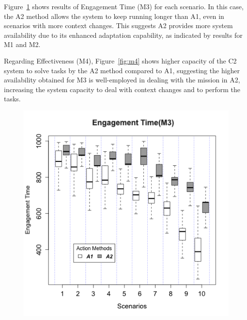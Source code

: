 Figure~\ref{fig:m3} shows results of Engagement Time (M3) for each scenario. In this case, the A2 method allows the system to keep running longer than A1, even in scenarios with more context changes. This suggests A2 provides more system availability due to its enhanced adaptation capability, as indicated by results for M1 and M2. 

 Regarding Effectiveness (M4), Figure~\ref{fig:m4} shows higher  capacity of the C2 system to solve tasks by the A2 method compared to A1, suggesting the higher availability obtained for M3 is well-employed in dealing with the mission in A2, increasing the system capacity to deal with context changes and to perform the tasks.


\begin{figure}
\centering
\begin{minipage}{.5\textwidth}
  \centering
  \includegraphics[width=0.95\linewidth]{img/graphs/Boxplot_M3.png}
  \label{fig:m3}
\end{minipage}%
\begin{minipage}{.5\textwidth}
  \centering

\end{minipage}
\end{figure}
